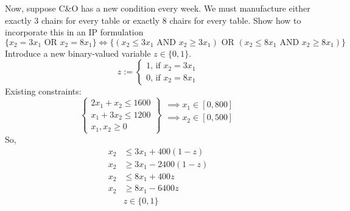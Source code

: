 Now, suppose C\&O has a new condition every week. We must manufacture either
exactly 3 chairs for every table or exactly 8 chairs for every table. Show
how to incorporate this in an IP formulation
\[
    \{x_2=3x_1 \text{ OR } x_2=8x_1\}
    \iff
    \{(x_2\le 3x_1 \text{ AND } x_2\ge3x_1) \text{ OR }
    (x_2\le 8x_1 \text{ AND } x_2\ge8x_1)\}
\]
Introduce a new binary-valued variable $z\in\{0,1\}$.
\[
    z:=
    \begin{cases}
        1 \text{, if } x_2=3x_1\\
        0 \text{, if } x_2=8x_1
    \end{cases}
\]
Existing constraints:
\[
    \left\{\begin{array}{r}
    2x_1 + x_2 \le 1600\\
    x_1 + 3x_2 \le 1200\\
    x_1, x_2 \ge 0
    \end{array}\right\}
    \begin{array}{r}
        \implies x_1\in[0,800]\\
        \implies x_2\in[0,500]\\
        \\
    \end{array}
\]
So,
\begin{align*}
    x_2&\le 3x_1+400(1-z)\\
    x_2&\ge 3x_1-2400(1-z)\\
    x_2&\le 8x_1+400z\\
    x_2&\ge 8x_1-6400z\\
    &z\in\{0,1\}
\end{align*}

